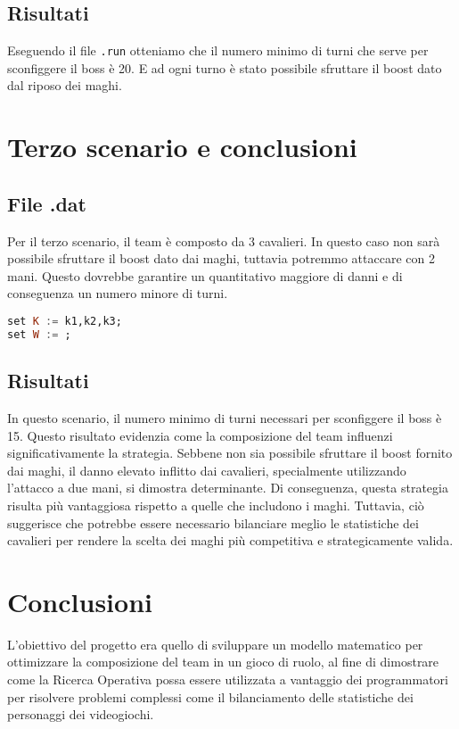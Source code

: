 \documentclass[12pt]{article}
\begin{document}
\subsection{Risultati}
Eseguendo il file \texttt{.run} otteniamo che il numero minimo di turni che serve per sconfiggere il boss è 20. E ad ogni turno è stato possibile sfruttare il boost dato dal riposo dei maghi.
\section{Terzo scenario e conclusioni}
\subsection{File .dat}
Per il terzo scenario, il team è composto da 3 cavalieri. In questo caso non sarà possibile sfruttare il boost dato dai maghi, tuttavia potremmo attaccare con 2 mani. Questo dovrebbe garantire un quantitativo maggiore di danni e di conseguenza un numero minore di turni.
\begin{lstlisting}[language=haskell, frame=single, captionpos=b, keywordstyle=\color{purple}]
set K := k1,k2,k3;
set W := ;
\end{lstlisting}
\subsection{Risultati}
In questo scenario, il numero minimo di turni necessari per sconfiggere il boss è 15. Questo risultato evidenzia come la composizione del team influenzi significativamente la strategia. Sebbene non sia possibile sfruttare il boost fornito dai maghi, il danno elevato inflitto dai cavalieri, specialmente utilizzando l'attacco a due mani, si dimostra determinante. Di conseguenza, questa strategia risulta più vantaggiosa rispetto a quelle che includono i maghi. Tuttavia, ciò suggerisce che potrebbe essere necessario bilanciare meglio le statistiche dei cavalieri per rendere la scelta dei maghi più competitiva e strategicamente valida.
\section{Conclusioni}
L'obiettivo del progetto era quello di sviluppare un modello matematico per ottimizzare la composizione del team in un gioco di ruolo, al fine di dimostrare come la Ricerca Operativa possa essere utilizzata a vantaggio dei programmatori per risolvere problemi complessi come il bilanciamento delle statistiche dei personaggi dei videogiochi.
\end{document}
